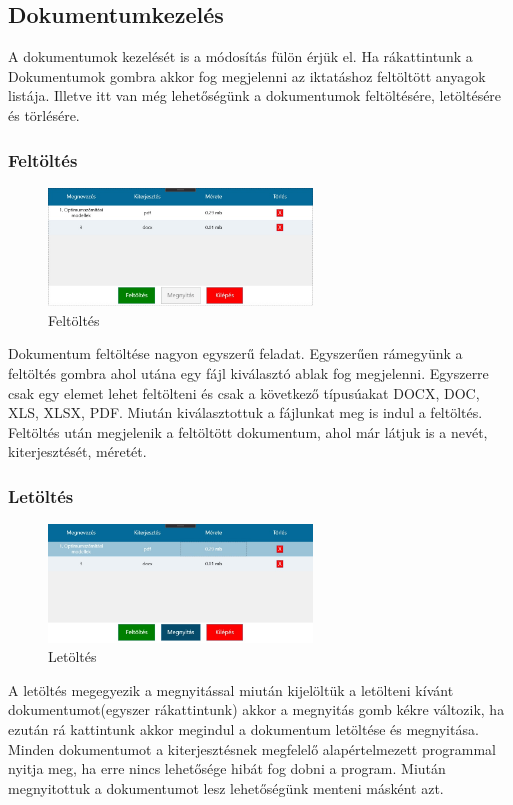 \documentclass[
]{thesis-ekf}
\theoremstyle{definition}
\theoremstyle{remark}
\begin{document}
\subsection{Dokumentumkezelés}
A dokumentumok kezelését is a módosítás fülön érjük el. Ha rákattintunk a Dokumentumok gombra akkor fog megjelenni az iktatáshoz feltöltött anyagok listája. Illetve itt van még lehetőségünk a dokumentumok feltöltésére, letöltésére és törlésére.
\subsubsection{Feltöltés}
\begin{figure}[h!]
	\centering
	\includegraphics[width=7cm]{dokukepek/cfeltoltes}
	\caption{Feltöltés}
	\label{fig:cfeltoltes}
\end{figure}
Dokumentum feltöltése nagyon egyszerű feladat. Egyszerűen rámegyünk a feltöltés gombra ahol utána egy fájl kiválasztó ablak fog megjelenni. Egyszerre csak egy elemet lehet feltölteni és csak a következő típusúakat DOCX, DOC, XLS, XLSX, PDF. Miután kiválasztottuk a fájlunkat meg is indul a feltöltés. Feltöltés után megjelenik a feltöltött dokumentum, ahol már látjuk is a nevét, kiterjesztését, méretét. 
\subsubsection{Letöltés}
\begin{figure}[h!]
	\centering
	\includegraphics[width=7cm]{dokukepek/cletoltes}
	\caption{Letöltés}
	\label{fig:cletoltes}
\end{figure}
A letöltés megegyezik a megnyitással miután kijelöltük a letölteni kívánt dokumentumot(egyszer rákattintunk) akkor a megnyitás gomb kékre változik, ha ezután rá kattintunk akkor megindul a dokumentum letöltése és megnyitása. Minden dokumentumot a kiterjesztésnek megfelelő alapértelmezett programmal nyitja meg, ha erre nincs lehetősége hibát fog dobni a program. Miután megnyitottuk a dokumentumot lesz lehetőségünk menteni másként azt.
\end{document}
